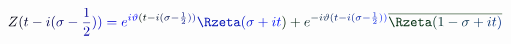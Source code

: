 \documentclass[12pt]{article}
\begin{document}
\makeatletter
\renewcommand*{\@textcolor}[3]{%
  \protect\leavevmode
  \begingroup
    \color#1{#2}#3%
  \endgroup
}
\makeatother
\begin{displaymath}
\mathcolor[RGB]{0,0,15}{Z} \mathcolor[RGB]{0,0,30}{(} \mathcolor[RGB]{0,0,45}{t} \mathcolor[RGB]{0,0,60}{-} \mathcolor[RGB]{0,0,75}{i} \mathcolor[RGB]{0,0,90}{(} \mathcolor[RGB]{0,0,105}{\sigma} \mathcolor[RGB]{0,0,120}{-} \mathcolor[RGB]{0,0,135}{\frac { \mathcolor[RGB]{0,0,150}{1} } { \mathcolor[RGB]{0,0,165}{2} } } \mathcolor[RGB]{0,0,180}{)} \mathcolor[RGB]{0,0,195}{)} \mathcolor[RGB]{0,0,210}{=} \mathcolor[RGB]{0,0,225}{e} ^ { \mathcolor[RGB]{0,0,240}{i} \mathcolor[RGB]{0,0,255}{\vartheta} \mathcolor[RGB]{0,15,0}{(} \mathcolor[RGB]{0,15,15}{t} \mathcolor[RGB]{0,15,30}{-} \mathcolor[RGB]{0,15,45}{i} \mathcolor[RGB]{0,15,60}{(} \mathcolor[RGB]{0,15,75}{\sigma} \mathcolor[RGB]{0,15,90}{-} \mathcolor[RGB]{0,15,105}{\frac { \mathcolor[RGB]{0,15,120}{1} } { \mathcolor[RGB]{0,15,135}{2} } } \mathcolor[RGB]{0,15,150}{)} \mathcolor[RGB]{0,15,165}{)} } \mathcolor[RGB]{0,15,180}{\Rzeta} \mathcolor[RGB]{0,15,195}{(} \mathcolor[RGB]{0,15,210}{\sigma} \mathcolor[RGB]{0,15,225}{+} \mathcolor[RGB]{0,15,240}{i} \mathcolor[RGB]{0,15,255}{t} \mathcolor[RGB]{0,30,0}{)} \mathcolor[RGB]{0,30,15}{+} \mathcolor[RGB]{0,30,30}{e} ^ { \mathcolor[RGB]{0,30,45}{-} \mathcolor[RGB]{0,30,60}{i} \mathcolor[RGB]{0,30,75}{\vartheta} \mathcolor[RGB]{0,30,90}{(} \mathcolor[RGB]{0,30,105}{t} \mathcolor[RGB]{0,30,120}{-} \mathcolor[RGB]{0,30,135}{i} \mathcolor[RGB]{0,30,150}{(} \mathcolor[RGB]{0,30,165}{\sigma} \mathcolor[RGB]{0,30,180}{-} \mathcolor[RGB]{0,30,195}{\frac { \mathcolor[RGB]{0,30,210}{1} } { \mathcolor[RGB]{0,30,225}{2} } } \mathcolor[RGB]{0,30,240}{)} \mathcolor[RGB]{0,30,255}{)} } \mathcolor[RGB]{0,45,0}{\overline { { \mathcolor[RGB]{0,45,15}{\Rzeta} \mathcolor[RGB]{0,45,30}{(} \mathcolor[RGB]{0,45,45}{1} \mathcolor[RGB]{0,45,60}{-} \mathcolor[RGB]{0,45,75}{\sigma} \mathcolor[RGB]{0,45,90}{+} \mathcolor[RGB]{0,45,105}{i} \mathcolor[RGB]{0,45,120}{t} \mathcolor[RGB]{0,45,135}{)} } } }
\end{displaymath}
\end{document}
